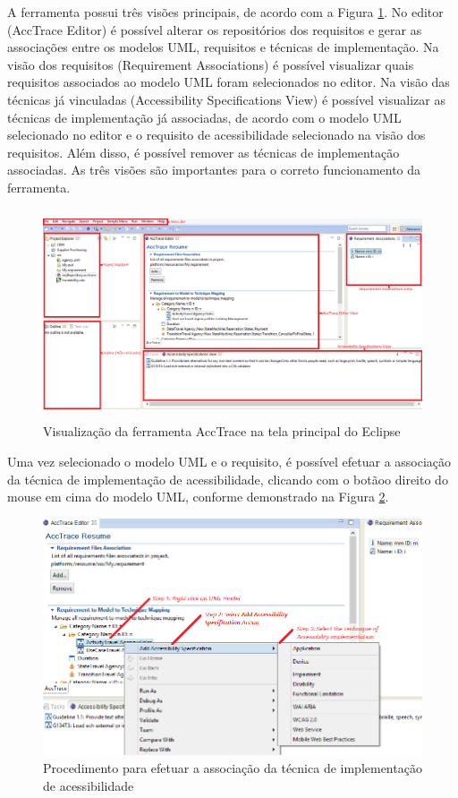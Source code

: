 \documentclass[runningheads,a4paper]{llncs}
\begin{document}
A ferramenta possui três visões principais, de acordo com a Figura \ref{fig:acctrace}. No editor (AccTrace Editor) é possível alterar os repositórios dos requisitos e gerar as associações entre os modelos UML, requisitos e técnicas de implementação. Na visão
dos requisitos (Requirement Associations) é possível visualizar quais requisitos associados
ao modelo UML foram selecionados no editor. Na visão das técnicas já vinculadas
(Accessibility Specifications View) é possível visualizar as técnicas de implementação já
associadas, de acordo com o modelo UML selecionado no editor e o requisito de acessibilidade
selecionado na visão dos requisitos. Além disso, é possível remover as técnicas de
implementação associadas. As três visões são importantes para o correto funcionamento
da ferramenta.

\begin{figure}[h]
\centering
\includegraphics[height=6.2cm]{./img/acctrace.png}
\caption{Visualização da ferramenta AccTrace na tela principal do
Eclipse}
\label{fig:acctrace}
\end{figure}

Uma vez selecionado o modelo UML e o requisito, é possível efetuar a associação da
técnica de implementação de acessibilidade, clicando com o botãoo direito do mouse em
cima do modelo UML, conforme demonstrado na Figura \ref{fig:rightclick}.

\begin{figure}[h]
\centering
\includegraphics[scale=0.45]{./img/rightclick.png}
\caption{Procedimento para efetuar a associação da técnica de implementação de
acessibilidade}
\label{fig:rightclick}
\end{figure}
\end{document}
